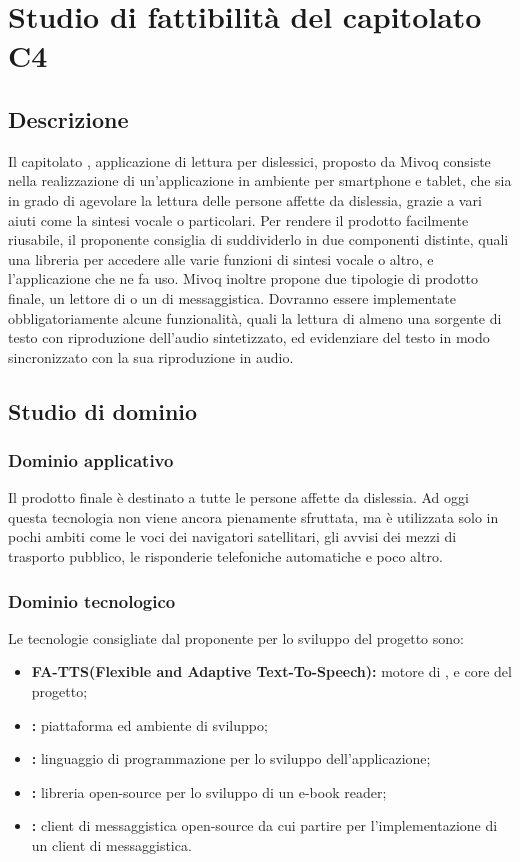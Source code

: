 \documentclass[../StudioDiFattibilita.tex]{subfiles}
\begin{document}
\section{Studio di fattibilità del capitolato C4}
	\subsection{Descrizione}
	Il capitolato , applicazione di lettura per dislessici, proposto da Mivoq consiste nella realizzazione di un'applicazione in ambiente  per smartphone e tablet, che sia in grado di agevolare la lettura delle persone affette da dislessia, grazie a vari aiuti come la sintesi vocale o  particolari. Per rendere il prodotto facilmente riusabile, il proponente consiglia di suddividerlo in due componenti distinte, quali una libreria per accedere alle varie funzioni di sintesi vocale o altro, e l'applicazione che ne fa uso. Mivoq inoltre propone due tipologie di prodotto finale, un lettore di  o un  di messaggistica. Dovranno essere implementate obbligatoriamente alcune funzionalità, quali la lettura di almeno una sorgente di testo con riproduzione dell'audio sintetizzato, ed evidenziare del testo in modo sincronizzato con la sua riproduzione in audio.

	\subsection{Studio di dominio}
	  	\subsubsection{Dominio applicativo}
		Il prodotto finale è destinato a tutte le persone affette da dislessia. Ad oggi questa tecnologia non viene ancora pienamente sfruttata, ma è utilizzata solo in pochi ambiti come le voci dei navigatori satellitari, gli avvisi dei mezzi di trasporto pubblico, le risponderie telefoniche automatiche e poco altro.

	 	\subsubsection{Dominio tecnologico}
		Le tecnologie consigliate dal proponente per lo sviluppo del progetto sono:
				\begin{itemize}
					\item \textbf{FA-TTS\gl (\textbf{F}lexible and \textbf{A}daptive \textbf{T}ext-\textbf{T}o-\textbf{S}peech):} motore di  , e core del progetto;
					\item \textbf{:} piattaforma ed ambiente di sviluppo;
					\item \textbf{:} linguaggio di programmazione per lo sviluppo dell'applicazione;
					\item \textbf{:} libreria open-source per lo sviluppo di un e-book reader;
					\item \textbf{:} client di messaggistica open-source da cui partire per l'implementazione di un client di messaggistica.
				\end{itemize}
\end{document}
